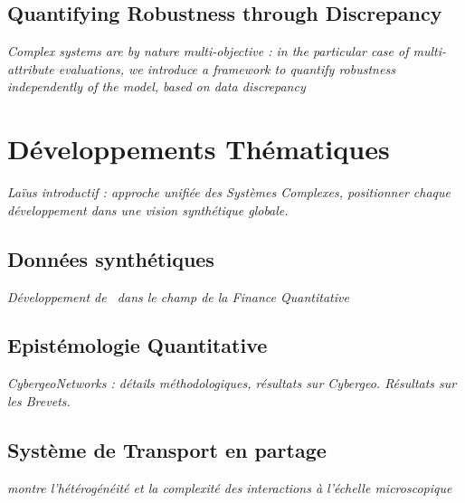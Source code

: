 \subsection{Quantifying Robustness through Discrepancy}

\textit{Complex systems are by nature multi-objective : in the particular case of multi-attribute evaluations, we introduce a framework to quantify robustness independently of the model, based on data discrepancy~\cite{raimbault2016discrepancy}}






\section{Développements Thématiques}

\textit{Laïus introductif : approche unifiée des Systèmes Complexes, positionner chaque développement dans une vision synthétique globale.} 

\subsection{Données synthétiques}

\textit{Développement de~\cite{raimbault2016generation} dans le champ de la Finance Quantitative}


\subsection{Epistémologie Quantitative}

\textit{CybergeoNetworks : détails méthodologiques, résultats sur Cybergeo. Résultats sur les Brevets.}

\subsection{Système de Transport en partage}

\textit{\cite{raimbault2015hybrid} montre l'hétérogénéité et la complexité des interactions à l'échelle microscopique}







